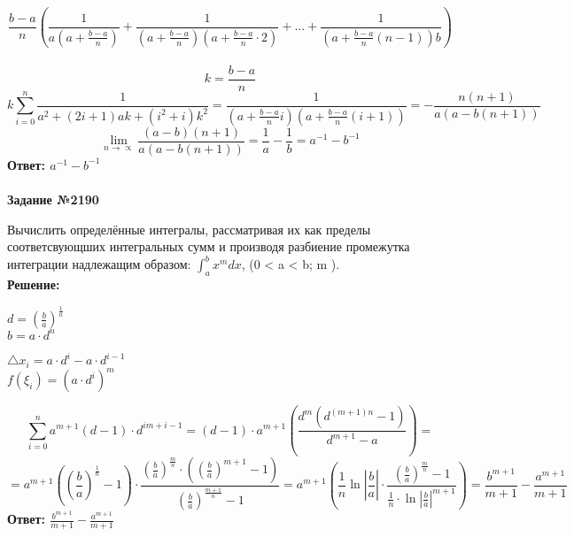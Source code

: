 \documentclass{article}
\begin{document}
$$\frac{b-a}{n} (\frac{1}{a(a+\frac{b-a}{n})} + \frac{1}{(a+\frac{b-a}{n})(a+\frac{b-a}{n}\cdot2)} + ... + \frac{1}{(a+\frac{b-a}{n} (n-1))b})$$\\
$$k = \frac{b-a}{n}$$
$$k\sum_{i=0}^{n} \frac{1}{a^{2} + (2i+1)ak + (i^{2} + i)k^{2}} = \frac{1}{(a+\frac{b-a}{n}i)(a+\frac{b-a}{n}(i+1))} = -\frac{n(n+1)}{a(a-b(n+1))}$$
$$\lim_{n \rightarrow \propto}\frac{(a-b)(n+1)}{a(a-b(n+1))} = \frac{1}{a} - \frac{1}{b} = {a^{-1}}-{b^{-1}}$$
\textbf{Ответ: ${a^{-1}}-{b^{-1}}$}
\\\\
\textbf{Задание №2190}
\par{Вычислить определённые интегралы, рассматривая их как пределы соответсвующших интегральных сумм и производя разбиение промежутка интеграции надлежащим образом: $\int_{a}^{b}x^{m}dx$, (0 < a < b; m ).}\\
\textbf{Решение:}\\
\begin{center}
    $d = (\frac{b}{a})^{\frac{1}{n}}$\\
    $b = a \cdot d^{n}$
\end{center}
\begin{center}
    $\triangle x_{i} = a \cdot d^{i} - a \cdot d^{i-1}$\\
    $f(\xi_{i}) = (a \cdot d^{i})^{m}$
\end{center}
$$\sum_{i=0}^{n}a^{m+1} (d-1) \cdot d^{im+i-1} = (d-1) \cdot a^{m+1} (\frac{d^{m}(d^{(m+1)n} -1)}{d^{m+1} - a}) =$$
$$= a^{m+1} ((\frac{b}{a})^{\frac{1}{n}} -1) \cdot \frac{(\frac{b}{a})^{\frac{m}{n}} \cdot ((\frac{b}{a})^{m+1} - 1)}{(\frac{b}{a})^{\frac{m+1}{n}} -1} = a^{m+1} (\frac{1}{n} \ln|\frac{b}{a}| \cdot \frac{(\frac{b}{a})^{\frac{m}{n}} -1}{\frac{1}{n} \cdot \ln|\frac{b}{a}|^{m+1}}) = \frac{b^{m+1}}{m+1} - \frac{a^{m+1}}{m+1}$$
\textbf{Ответ: $\frac{b^{m+1}}{m+1} - \frac{a^{m+1}}{m+1}$}
\end{document}
